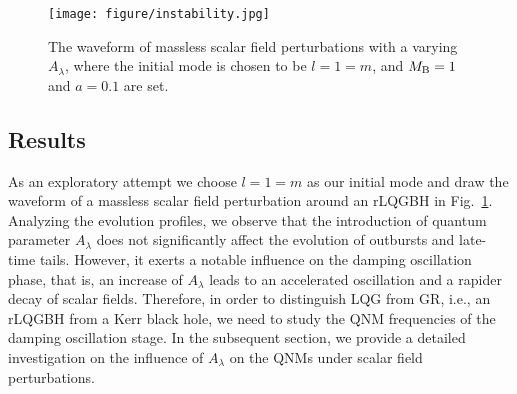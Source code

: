 \documentclass[12pt]{article}
\begin{document}
 \begin{figure}[htbp]
 	\centering
 	\begin{minipage}[t]{0.5\linewidth}
 		\centering
 		\texttt{[image: figure/instability.jpg]}
 	\end{minipage}
 	\caption{
 		The waveform of massless scalar field perturbations with a varying $A_\lambda$, where the initial mode is chosen to be $l=1=m$, and $M_{\rm B}=1$ and $a=0.1$ are set.}
 	\label{instab}
 \end{figure}

\subsection{Results}\label{sec:TD-result}
 As an exploratory attempt we choose $l=1=m$ %
 as  our initial  mode and draw the waveform of a massless scalar field perturbation around an rLQGBH in Fig.~\ref{instab}.  
 Analyzing the evolution profiles, we observe that the introduction of quantum parameter $A_\lambda$ does not significantly affect the evolution of outbursts and late-time tails. 
 However, it exerts a notable influence on the damping oscillation phase, that is, an increase of $A_\lambda$ leads to an accelerated oscillation and a  rapider decay of scalar fields. Therefore, in order to distinguish LQG from GR, i.e., an rLQGBH from a Kerr black hole, we need to study the QNM frequencies of the damping oscillation stage.
 In the subsequent section, we provide a detailed investigation on the influence of $A_\lambda$ on the  QNMs under scalar field perturbations.
 


    
    
\end{document}
